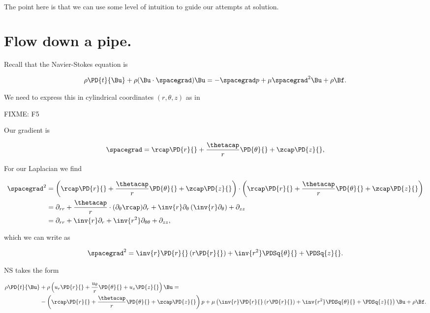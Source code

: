 The point here is that we can use some level of intuition to guide our attempts at solution.

\section{Flow down a pipe.}

Recall that the Navier-Stokes equation is

\begin{equation}\label{eqn:continuumL12:570}
\rho \PD{t}{\Bu} + \rho (\Bu \cdot \spacegrad) \Bu = - \spacegrad p + \mu \spacegrad^2 \Bu + \rho \Bf.
\end{equation}

We need to express this in cylindrical coordinates $(r, \theta, z)$ as in

FIXME: F5

Our gradient is 

\begin{equation}\label{eqn:classicalMechanicsPs2:610}
\spacegrad = 
\rcap \PD{r}{} + 
\frac{\thetacap}{r} \PD{\theta}{} + 
\zcap \PD{z}{},
\end{equation}

For our Laplacian we find

\begin{align*}
\spacegrad^2 &= 
\left(
\rcap \PD{r}{} + 
\frac{\thetacap}{r} \PD{\theta}{} + 
\zcap \PD{z}{}
\right)
 \cdot
\left(
\rcap \PD{r}{} + 
\frac{\thetacap}{r} \PD{\theta}{} + 
\zcap \PD{z}{}
\right) \\
&=
\partial_{rr} 
+ \frac{\thetacap}{r} \cdot (\partial_\theta \rcap) \partial_r
+ \inv{r} \partial_\theta \left( \inv{r} \partial_\theta \right)
+ \partial_{zz} \\
&=
\partial_{rr} + \inv{r} \partial_r + \inv{r^2} \partial_{\theta\theta} + \partial_{zz},
\end{align*}

which we can write as

\begin{equation}\label{eqn:continuumL12:630}
\spacegrad^2 = \inv{r} \PD{r}{} \left( r \PD{r}{} \right) + \inv{r^2} \PDSq{\theta}{} + \PDSq{z}{}.
\end{equation}

NS takes the form

\begin{equation}\label{eqn:classicalMechanicsPs2:650}
\begin{aligned}
\rho \PD{t}{\Bu} &+ \rho 
\left(
u_r \PD{r}{} + 
\frac{u_\theta}{r} \PD{\theta}{} + 
u_z \PD{z}{} \right) \Bu 
=  \\
&- 
\left(
\rcap \PD{r}{} + 
\frac{\thetacap}{r} \PD{\theta}{} + 
\zcap \PD{z}{}
\right)
p + \mu \left(
\inv{r} \PD{r}{} \left( r \PD{r}{} \right) + \inv{r^2} \PDSq{\theta}{} + \PDSq{z}{} \right)
\Bu + \rho \Bf.
\end{aligned}
\end{equation}

